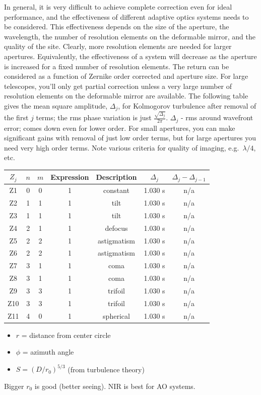 \documentclass[12pt]{article}
\newcommand{\mynotes}[1]{\textcolor{myBlue}{#1}}
\begin{document}
In general, it is very difficult to achieve complete correction even for ideal
performance, and the effectiveness of different adaptive optics systems needs
to be considered. This effectiveness depends on the size of the aperture, the
wavelength, the number of resolution elements on the deformable mirror, and the
quality of the site. Clearly, more resolution elements are needed for larger
apertures. Equivalently, the effectiveness of a system will decrease as the
aperture is increased for a fixed number of resolution elements.  The return
can be considered as a function of Zernike order corrected and aperture size.
For large telescopes, you'll only get
partial correction unless a very large number of resolution elements on the
deformable mirror are available. The following table gives the mean square
amplitude, $\Delta_{j}$, for Kolmogorov turbulence after removal of the first
$j$ terms; the rms phase variation is just
$ \frac{\sqrt{\Delta_{j}}}{2\pi} $.
\mynotes{$\Delta_{j}$ - rms around wavefront error; comes down even
for lower order.}
For small apertures, you can make significant gains with removal of just low
order terms, but for large apertures you need very high order terms. Note
various criteria for quality of imaging, e.g.\ $\lambda/4$, etc.
\newpage
\begin{table}[th]
\centering
\begin{tabular}{c c c c c c c}
    $Z_j$ & $n$ & $m$ & Expression & Description &
    $\Delta_j$ & $\Delta_j - \Delta_{j-1}$\\
    \hline\hline
    Z1 & 0 & 0 & 1 & constant & 1.030 s & n/a\\
    Z2 & 1 & 1 & 1 & tilt & 1.030 s & n/a\\
    Z3 & 1 & 1 & 1 & tilt & 1.030 s & n/a\\
    Z4 & 2 & 1 & 1 & defocus & 1.030 s & n/a\\
    Z5 & 2 & 2 & 1 & astigmatism & 1.030 s & n/a\\
    Z6 & 2 & 2 & 1 & astigmatism & 1.030 s & n/a\\
    Z7 & 3 & 1 & 1 & coma & 1.030 s & n/a\\
    Z8 & 3 & 1 & 1 & coma & 1.030 s & n/a\\
    Z9 & 3 & 3 & 1 & trifoil & 1.030 s & n/a\\
    Z10 & 3 & 3 & 1 & trifoil & 1.030 s & n/a\\
    Z11 & 4 & 0 & 1 & spherical & 1.030 s & n/a\\
    \hline
    \end{tabular}
\end{table}
\begin{itemize}
    \item $r$ = distance from center circle
    \item $\phi$ = azimuth angle
    \item $S=(D/r_0)^{5/3}$ \mynotes{(from turbulence theory)}
\end{itemize}
\mynotes{Bigger $r_{0}$ is good (better seeing). NIR is best for
AO systems.}
\end{document}
